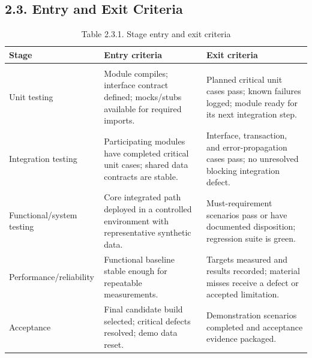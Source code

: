 \subsection{2.3. Entry and Exit Criteria}\label{entry-and-exit-criteria}

{\def\LTcaptype{none} %
\begin{longtable}[]{|
  >{\raggedright\arraybackslash}m{}|
  >{\raggedright\arraybackslash}m{}|
  >{\raggedright\arraybackslash}m{}|}
\hline
\begin{minipage}[c]{\linewidth}\raggedright
\textbf{Stage}
\end{minipage} & \begin{minipage}[c]{\linewidth}\raggedright
\textbf{Entry criteria}
\end{minipage} & \begin{minipage}[c]{\linewidth}\raggedright
\textbf{Exit criteria}
\end{minipage} \\
\hline
\endhead

\caption*{Table 2.3.1. Stage entry and exit criteria}\\
\endlastfoot
Unit testing & Module compiles; interface contract defined; mocks/stubs available for required imports. & Planned critical unit cases pass; known failures logged; module ready for its next integration step. \\ \hline
Integration testing & Participating modules have completed critical unit cases; shared data contracts are stable. & Interface, transaction, and error-propagation cases pass; no unresolved blocking integration defect. \\ \hline
Functional/system testing & Core integrated path deployed in a controlled environment with representative synthetic data. & Must-requirement scenarios pass or have documented disposition; regression suite is green. \\ \hline
Performance/reliability & Functional baseline stable enough for repeatable measurements. & Targets measured and results recorded; material misses receive a defect or accepted limitation. \\ \hline
Acceptance & Final candidate build selected; critical defects resolved; demo data reset. & Demonstration scenarios completed and acceptance evidence packaged. \\ \hline
\end{longtable}
}

